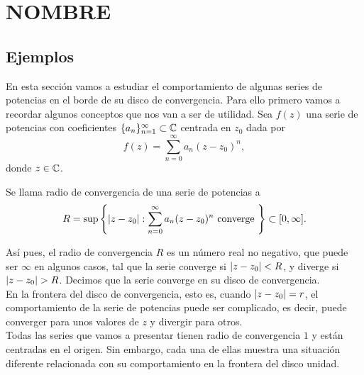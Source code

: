 \chapter{NOMBRE}


\section{Ejemplos}
\label{sec:ejemplos}

En esta sección vamos a estudiar el comportamiento de algunas series de potencias en el borde de su disco de convergencia. Para ello primero vamos a recordar algunos conceptos que nos van a ser de utilidad. Sea $f(z)$ una serie de potencias con coeficientes $\{a_n\}_{n=1}^{\infty} \subset \mathbb{C}$ centrada en $z_0$ dada por
\begin{equation*}
    f(z) =  \sum_{n=0}^\infty a_n (z-z_0)^n,
\end{equation*}
donde $z \in \mathbb{C}$. \\

\begin{definition}
    Se llama radio de convergencia de una serie de potencias a
    \begin{equation*}
        R = \sup \left\{ \left\lvert z - z_0\right\rvert : \sum _{n=0}^{\infty} a_n (z - z_0)^n \text{ converge } \right\} \subset [0, \infty].
    \end{equation*}
\end{definition}
\medskip

Así pues, el radio de convergencia $R$ es un número real no negativo, que puede ser $\infty$ en algunos casos, tal que la serie converge si $\left\lvert z - z_0\right\rvert < R$, y diverge si $\left\lvert z - z_0\right\rvert > R$. Decimos que la serie converge en su disco de convergencia. \\

En la frontera del disco de convergencia, esto es, cuando $\left\lvert z - z_0\right\rvert = r$, el comportamiento de la serie de potencias puede ser complicado, es decir, puede converger para unos valores de $z$ y divergir para otros. \\

Todas las series que vamos a presentar tienen radio de convergencia $1$ y están centradas en el origen. Sin embargo, cada una de ellas muestra una situación diferente relacionada con su comportamiento en la frontera del disco unidad. \\


